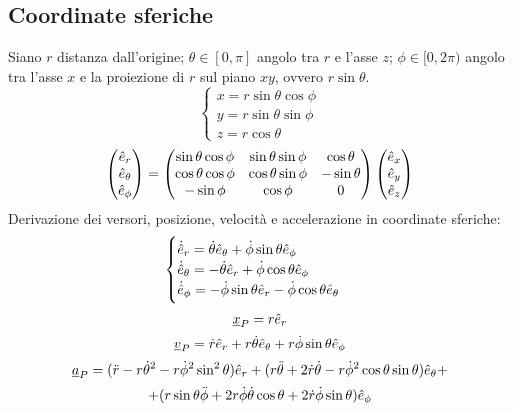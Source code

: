 \documentclass[11pt,landscape,a4paper]{article}
\begin{document}
\begin{multicols}{3}
    \subsection{Coordinate sferiche}
        Siano $r$ distanza dall'origine; $\theta \in [0,\pi]$ angolo tra $r$ e l'asse $z$; $\phi \in [0, 2\pi)$ angolo tra l'asse $x$ e la proiezione di $r$ sul piano $xy$, ovvero $r \sin \theta$.
        $$\begin{cases}
            x = r \sin \theta \cos \phi \\
            y = r \sin \theta \sin \phi \\
            z = r \cos \theta
        \end{cases}$$
        $$\begin{pmatrix} \hat{e}_r \\ \hat{e}_\theta \\ \hat{e}_\phi \end{pmatrix} = 
        \begin{pmatrix}
            \sin \theta \cos \phi & \sin \theta \sin \phi & \cos \theta \\
            \cos \theta \cos \phi & \cos \theta \sin \phi & -\sin \theta \\
            - \sin \phi & \cos \phi & 0
        \end{pmatrix}
        \begin{pmatrix} \hat{e}_x \\\hat{e}_y \\\hat{e}_z \end{pmatrix}$$
        Derivazione dei versori, posizione, velocità e accelerazione in coordinate sferiche:
            $$\begin{cases}
                \dot{\hat{e}}_r = \dot{\theta}\hat{e}_\theta + \dot{\phi}\sin\theta \hat{e}_\phi\\
                \dot{\hat{e}}_\theta = -\dot{\theta}\hat{e}_r + \dot{\phi}\cos \theta \hat{e}_\phi\\
                \dot{\hat{e}}_\phi = -\dot{\phi}\sin \theta \hat{e}_r - \dot{\phi}\cos \theta \hat{e}_\theta
            \end{cases}
            $$
            $$ \underline{x}_P = r\hat{e}_r$$
            $$ \underline{v}_P = \dot{r} \hat{e}_r + r\dot{\theta}\hat{e}_\theta + r\dot{\phi}\sin \theta \hat{e}_\phi$$
            $$ \underline{a}_P = (\ddot{r} - r\dot{\theta}^2 - r\dot{\phi}^2 \sin^2 \theta )\hat{e}_r + (r\ddot{\theta} + 2\dot{r}\dot{\theta} - r\dot{\phi}^2 \cos \theta \sin \theta ) \hat{e}_\theta +$$ $$ + (r\sin\theta \ddot{\phi} + 2r \dot{\phi} \dot{\theta} \cos \theta  + 2 \dot{r} \dot{\phi} \sin \theta)\hat{e}_\phi $$

\end{multicols}
\end{document}

